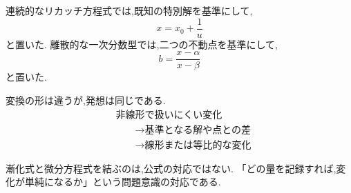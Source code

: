 連続的なリカッチ方程式では,既知の特別解を基準にして,
\[
  x=x_0+\frac1u
\]
と置いた.
離散的な一次分数型では,二つの不動点を基準にして,
\[
  b=\frac{x-\alpha}{x-\beta}
\]
と置いた.

変換の形は違うが,発想は同じである.
\begin{align*}
  &\text{非線形で扱いにくい変化}\\
  &\qquad\longrightarrow
  \text{基準となる解や点との差}\\
  &\qquad
  \longrightarrow
  \text{線形または等比的な変化}
\end{align*}

漸化式と微分方程式を結ぶのは,公式の対応ではない.
「どの量を記録すれば,変化が単純になるか」という問題意識の対応である.
